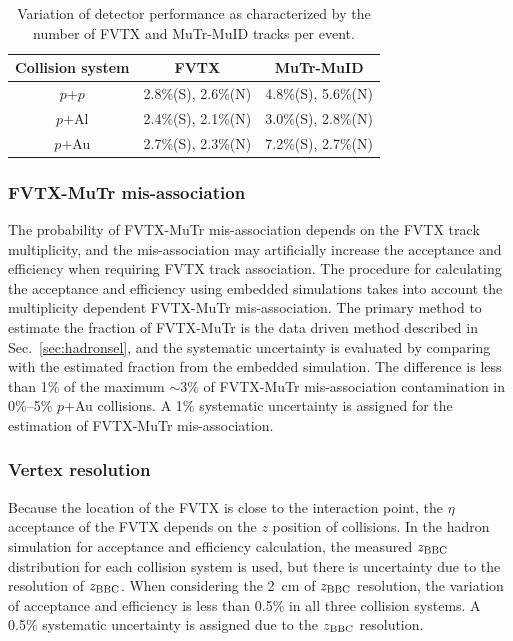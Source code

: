 \documentclass[twocolumn,letterpaper,aps,prc,longbibliography,superscriptaddress,nofootinbib,floatfix]{revtex4-2}
\newcommand{\zbbc}{\mbox{$z_{\rm BBC}$}\xspace}
\newcommand{\pp}{\mbox{$p$+$p$}\xspace}
\newcommand{\pau}{\mbox{$p$$+$Au}\xspace}
\newcommand{\pal}{\mbox{$p$$+$Al}\xspace}
\begin{document}
\begin{table}[tbh]
\caption{\label{tab:sys_detector}
Variation of detector performance as characterized by the number of FVTX 
and MuTr-MuID tracks per event.}
\begin{ruledtabular}
\begin{tabular}{ccc}
 Collision system & FVTX & MuTr-MuID \\\hline
 \pp & 2.8\%(S), 2.6\%(N) & 4.8\%(S), 5.6\%(N) \\
 \pal & 2.4\%(S), 2.1\%(N) & 3.0\%(S), 2.8\%(N) \\
 \pau & 2.7\%(S), 2.3\%(N) & 7.2\%(S), 2.7\%(N) \\
\end{tabular}
\end{ruledtabular}
\end{table}

\subsubsection{FVTX-MuTr mis-association}

The probability of FVTX-MuTr mis-association depends on the FVTX track 
multiplicity, and the mis-association may artificially increase the 
acceptance and efficiency when requiring FVTX track association. The 
procedure for calculating the acceptance and efficiency using embedded 
simulations takes into account the multiplicity dependent FVTX-MuTr 
mis-association. The primary method to estimate the fraction of 
FVTX-MuTr is the data driven method described in 
Sec.~\ref{sec:hadronsel}, and the systematic uncertainty is evaluated by 
comparing with the estimated fraction from the embedded simulation. The 
difference is less than 1\% of the maximum $\sim3\%$ of FVTX-MuTr 
mis-association contamination in 0\%--5\% \pau collisions. A 1\% 
systematic uncertainty is assigned for the estimation of FVTX-MuTr 
mis-association.

\subsubsection{Vertex resolution}

Because the location of the FVTX is close to the interaction point, the 
$\eta$ acceptance of the FVTX depends on the $z$ position of collisions. 
In the hadron simulation for acceptance and efficiency calculation, the 
measured \zbbc distribution for each collision system is used, but there 
is uncertainty due to the resolution of \zbbc. When considering the 2~cm 
of \zbbc resolution, the variation of acceptance and efficiency is less 
than 0.5\% in all three collision systems. A 0.5\% systematic 
uncertainty is assigned due to the \zbbc resolution.
\end{document}
